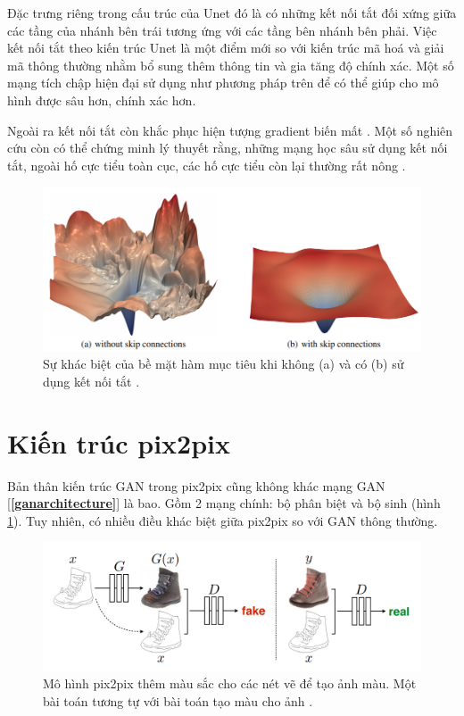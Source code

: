 \documentclass[a4paper, 12pt]{report}
\begin{document}
Đặc trưng riêng trong cấu trúc của Unet đó là có những kết nối tắt đối xứng giữa các tầng của nhánh bên trái tương ứng với các tầng bên nhánh bên phải.
Việc kết nối tắt theo kiến trúc Unet là một điểm mới so với kiến trúc mã hoá và giải mã thông thường nhằm bổ sung thêm thông tin và gia tăng độ chính xác.
Một số mạng tích chập hiện đại sử dụng như phương pháp trên \cite{he2015deep, huang2018densely} để có thể giúp cho mô hình được sâu hơn, chính xác hơn.\vspace{5pt}

Ngoài ra kết nối tắt còn khắc phục hiện tượng gradient biến mất \cite{adaloglou2020skip}.
Một số nghiên cứu còn có thể chứng minh lý thuyết rằng, những mạng học sâu sử dụng kết nối tắt, ngoài hố cực tiểu toàn cục, các hố cực tiểu còn lại thường rất nông \cite{wang2020skip}.

\begin{figure}[!h]
\captionsetup{width=0.8\textwidth}
\centering
\includegraphics[width=15cm]{images/objwithskip.png}
\caption{Sự khác biệt của bề mặt hàm mục tiêu khi không (a) và có (b) sử dụng kết nối tắt \cite{li2018visualizing}.}
\end{figure}

\section{Kiến trúc pix2pix}\label{pix2pixarchitecture}

Bản thân kiến trúc GAN trong pix2pix cũng không khác mạng GAN [\textbf{\ref{ganarchitecture}}] là bao.
Gồm 2 mạng chính: bộ phân biệt và bộ sinh (hình \ref{fig:pix2pixarchitecture}).
Tuy nhiên, có nhiều điều khác biệt giữa pix2pix so với GAN thông thường.

\begin{figure}[!h]
\captionsetup{width=0.8\textwidth}
\centering
\includegraphics[width=17cm]{images/2_9.PNG}
\caption{Mô hình pix2pix thêm màu sắc cho các nét vẽ để tạo ảnh màu. Một bài toán tương tự với bài toán tạo màu cho ảnh \cite{isola2018imagetoimage}.}
\label{fig:pix2pixarchitecture}
\end{figure}
\end{document}
